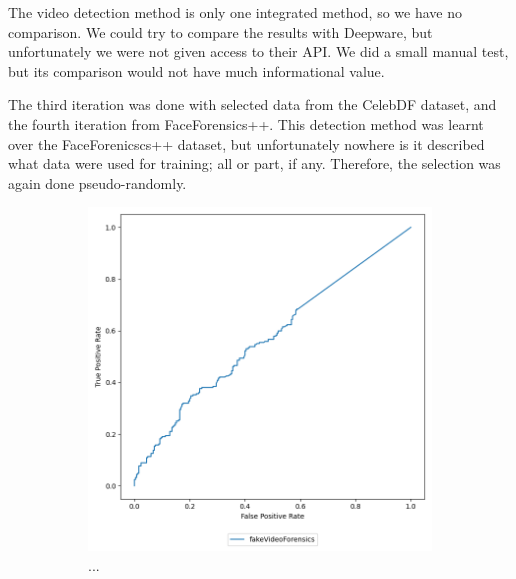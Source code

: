 The video detection method is only one integrated method, so we have no comparison. We could try to compare the results with Deepware, but unfortunately we were not given access to their API. We did a small manual test, but its comparison would not have much informational value.

The third iteration was done with selected data from the CelebDF dataset, and the fourth iteration from FaceForensics++. This detection method was learnt over the FaceForenicscs++ dataset, but unfortunately nowhere is it described what data were used for training; all or part, if any. Therefore, the selection was again done pseudo-randomly.

\begin{figure}[H]
    \begin{subfigure}[h]{0.5\linewidth}
        \centering
        \includegraphics[width=1\linewidth]{other-fig/tests/cdf_methods.png}
        \caption{...}
    \end{subfigure}
    \hfill
    \begin{subfigure}[h]{0.5\linewidth}
        \centering

\end{subfigure}
\end{figure}
